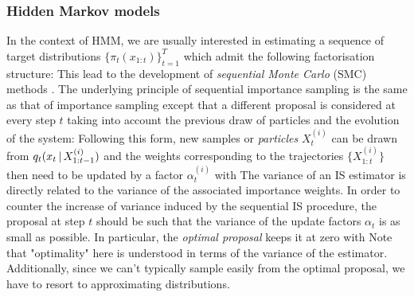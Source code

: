 \subsubsection{Hidden Markov models}
In the context of HMM, we are usually interested in estimating a sequence of target distributions $\{\pi_{t}(x_{1:t})\}_{t=1}^{T}$ which admit the following factorisation structure:
%
%
This lead to the development of \emph{sequential Monte Carlo} (SMC) methods \citep[chapter 14.3]{robert04}. The underlying principle of sequential importance sampling is the same as that of importance sampling except that a different proposal is considered at every step $t$ taking into account the previous draw of particles and the evolution of the system:
%
%
Following this form, new samples or \emph{particles} $X^{(i)}_t$ can be drawn from $q_{t}(x_{t}\,|\, X^{(i)}_{1:t-1})$ and the weights corresponding to the trajectories $\{X^{(i)}_{1:t}\}$ then need to be updated by a factor $\alpha^{(i)}_{t}$ with
%
%
The variance of an IS estimator is directly related to the variance of the associated importance weights. In order to counter the increase of variance induced by the sequential IS procedure, the proposal at step $t$ should be such that the variance of the update factors $\alpha_t$ is as small as possible. In particular, the \emph{optimal proposal} \citep{doucet11} keeps it at zero with
Note that "optimality" here is understood in terms of the variance of the estimator. Additionally, since we can't typically sample easily from the optimal proposal, we have to resort to approximating distributions.

